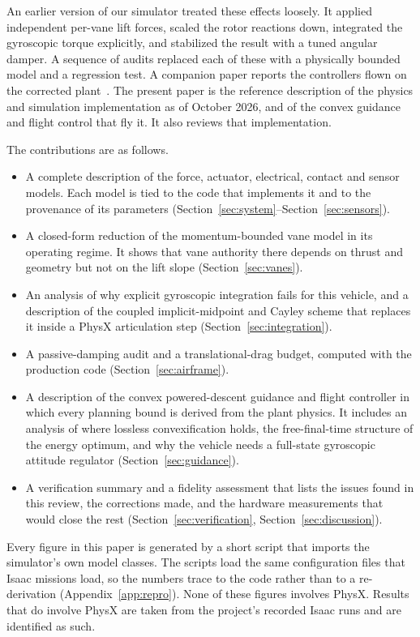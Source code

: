 \documentclass[journal]{IEEEtran}
\newcommand{\refapp}[1]{Appendix~\ref{#1}}
\newcommand{\refsec}[1]{Section~\ref{#1}}
\begin{document}
An earlier version of our simulator treated these effects loosely.
It applied independent per-vane lift forces, scaled the rotor reactions down, integrated the gyroscopic torque explicitly, and stabilized the result with a tuned angular damper.
A sequence of audits replaced each of these with a physically bounded model and a regression test.
A companion paper reports the controllers flown on the corrected plant~\cite{tang2026rl}.
The present paper is the reference description of the physics and simulation implementation as of October 2026, and of the convex guidance and flight control that fly it.
It also reviews that implementation.

The contributions are as follows.
\begin{itemize}
\item A complete description of the force, actuator, electrical, contact and sensor models.
Each model is tied to the code that implements it and to the provenance of its parameters (\refsec{sec:system}--\refsec{sec:sensors}).
\item A closed-form reduction of the momentum-bounded vane model in its operating regime.
It shows that vane authority there depends on thrust and geometry but not on the lift slope (\refsec{sec:vanes}).
\item An analysis of why explicit gyroscopic integration fails for this vehicle, and a description of the coupled implicit-midpoint and Cayley scheme that replaces it inside a PhysX articulation step (\refsec{sec:integration}).
\item A passive-damping audit and a translational-drag budget, computed with the production code (\refsec{sec:airframe}).
\item A description of the convex powered-descent guidance and flight controller in which every planning bound is derived from the plant physics.
It includes an analysis of where lossless convexification holds, the free-final-time structure of the energy optimum, and why the vehicle needs a full-state gyroscopic attitude regulator (\refsec{sec:guidance}).
\item A verification summary and a fidelity assessment that lists the issues found in this review, the corrections made, and the hardware measurements that would close the rest (\refsec{sec:verification}, \refsec{sec:discussion}).
\end{itemize}

Every figure in this paper is generated by a short script that imports the simulator's own model classes.
The scripts load the same configuration files that Isaac missions load, so the numbers trace to the code rather than to a re-derivation (\refapp{app:repro}).
None of these figures involves PhysX.
Results that do involve PhysX are taken from the project's recorded Isaac runs and are identified as such.
\end{document}
